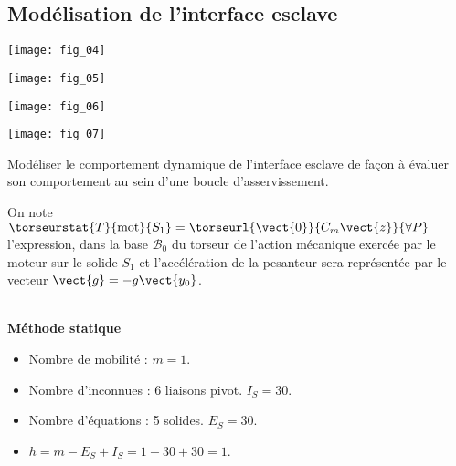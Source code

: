 \begin{multicols}{2}
\begin{multicols}{2}
\ifprof
\newpage
\else
\fi

\section*{Modélisation de l’interface esclave}
\ifprof
\else

\begin{center}
\texttt{[image: fig\_04]}
\end{center}

\begin{center}
\texttt{[image: fig\_05]}
\end{center}

\begin{center}
\texttt{[image: fig\_06]}
\end{center}

\begin{center}
\texttt{[image: fig\_07]}
\end{center}

\fi

\begin{obj}
Modéliser le comportement dynamique de l’interface esclave de façon à évaluer son
comportement au sein d’une boucle d’asservissement.
\end{obj}

\ifprof
\else

On note $\torseurstat{T}{\text{mot}}{S_1}=\torseurl{\vect{0}}{C_m\vect{z}}{\forall P}$ l’expression, dans la base $\mathcal{B}_0$ du torseur de l’action mécanique exercée par le moteur sur le solide $S_1$ et
l’accélération de la pesanteur sera représentée par le vecteur $\vect{g} = -g \vect{y_0}$.

\fi
{}
\ifprof
\begin{corrige}~\\

\textbf{Méthode statique}
\begin{itemize}
\item Nombre de mobilité : $m=1$.
\item Nombre d'inconnues : 6 liaisons pivot. $I_S=30$. 
\item Nombre d'équations : 5 solides. $E_S = 30$. 
\item $h=m-E_S+I_S = 1-30+30=1$. 
\end{itemize}


\end{corrige}
\end{multicols}
\end{multicols}
